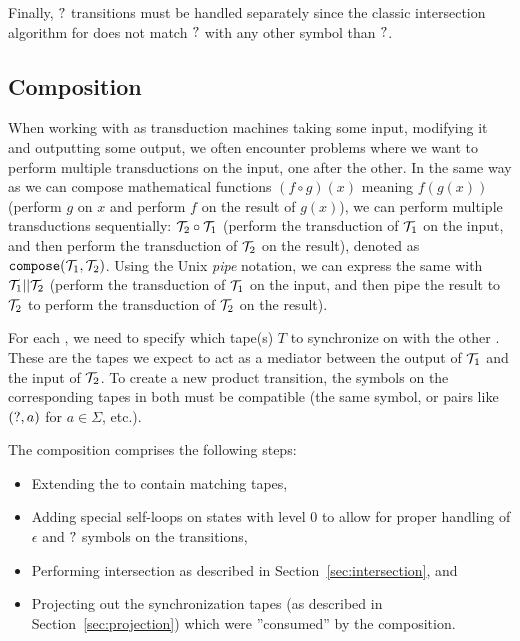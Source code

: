 Finally, $?$ transitions must be handled separately since the classic intersection algorithm for \nfas does not match $?$ with any other symbol than $?$.

\subsection{Composition}

When working with \nfts as transduction machines taking some input, modifying it and outputting some output, we often encounter problems where we want to perform multiple transductions on the input, one after the other.
In the same way as we can compose mathematical functions $(f \circ g)(x)$ meaning $f(g(x))$ (perform $g$ on $x$ and perform $f$ on the result of $g(x)$),
we can perform multiple \nft transductions sequentially: $\mathcal{T}_2 \circ \mathcal{T}_1$
(perform the transduction of $\mathcal{T}_1$ on the input, and then perform the transduction of $\mathcal{T}_2$ on the result), denoted as $\texttt{compose}(\mathcal{T}_1, \mathcal{T}_2)$.
Using the Unix \emph{pipe} notation, we can express the same with $\mathcal{T}_1 || \mathcal{T}_2$
(perform the transduction of $\mathcal{T}_1$ on the input, and then pipe the result to $\mathcal{T}_2$ to perform the transduction of $\mathcal{T}_2$ on the result).

For each \nft, we need to specify which tape(s) $T$ to synchronize on with the other \nft.
These are the tapes we expect to act as a mediator between the output of $\mathcal{T}_1$ and the input of $\mathcal{T}_2$.
To create a new product transition, the symbols on the corresponding tapes in both \nfts must be compatible (the same symbol, or pairs like $(?, a)$ for $a \in \Sigma$, etc.).

The composition comprises the following steps:
\begin{itemize}
  \item Extending the \nfts to contain matching tapes,
  \item Adding special self-loops on states with level $0$ to allow for proper handling of $\epsilon$ and $?$ symbols on the transitions,
  \item Performing \nft intersection as described in Section~\ref{sec:intersection}, and
  \item Projecting out the synchronization tapes (as described in Section~\ref{sec:projection}) which were ''consumed'' by the composition.
\end{itemize}


